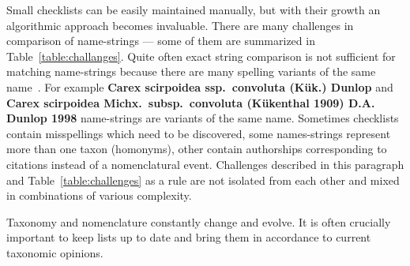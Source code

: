 \documentclass{bmcart}
\begin{document}
  Small checklists can be easily maintained manually, but with their growth an
  algorithmic approach becomes invaluable. There are many challenges in
  comparison of name-strings --- some of them are summarized in
  Table~\ref{table:challanges}. Quite often exact string comparison is not
  sufficient for matching name-strings because there are many spelling variants
  of the same name~\cite{Patterson2016}. For example  \textbf{Carex scirpoidea
  ssp.\ convoluta (Kük.) Dunlop} and \textbf{Carex scirpoidea Michx.\
  subsp.\ convoluta (Kükenthal 1909) D.A. Dunlop 1998} name-strings are
  variants of the same name. Sometimes checklists contain misspellings which
  need to be discovered, some names-strings represent more than one taxon
  (homonyms), other contain authorships corresponding to citations instead of a
  nomenclatural event. Challenges described in this paragraph and
  Table~\ref{table:challenges} as a rule are not isolated from each other and
  mixed in combinations of various complexity.

  Taxonomy and nomenclature constantly change and evolve. It is often crucially
  important to keep lists up to date and bring them in accordance to current
  taxonomic opinions.
\end{document}

